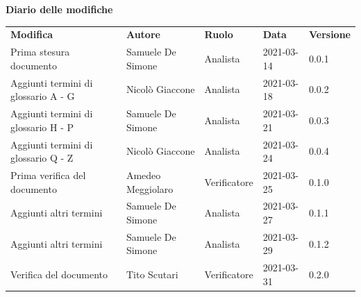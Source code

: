 \documentclass[a4paper]{article}
\begin{document}
\begin{center}
    \textbf{\Large Diario delle modifiche}\\
    \vspace{10px}
    \begin{table}[h!]
        \centering
        \renewcommand{\arraystretch}{1.8}
        \begin{tabular}{p{150px} p{90px} p{50px} p{60px} p{45px}}
            \rowcolor{logo!70} \textbf{Modifica} & \textbf{Autore}   & \textbf{Ruolo} & \textbf{Data} & \textbf{Versione} \\
            Prima stesura documento              & Samuele De Simone & Analista       & 2021-03-14    & 0.0.1             \\
            Aggiunti termini di glossario A - G  & Nicolò Giaccone   & Analista       & 2021-03-18    & 0.0.2             \\
            Aggiunti termini di glossario H - P  & Samuele De Simone & Analista       & 2021-03-21    & 0.0.3             \\
            Aggiunti termini di glossario Q - Z  & Nicolò Giaccone   & Analista       & 2021-03-24    & 0.0.4             \\
            Prima verifica del documento         & Amedeo Meggiolaro & Verificatore   & 2021-03-25    & 0.1.0             \\
            Aggiunti altri termini               & Samuele De Simone & Analista       & 2021-03-27    & 0.1.1             \\
            Aggiunti altri termini               & Samuele De Simone & Analista       & 2021-03-29    & 0.1.2             \\
            Verifica del documento               & Tito Scutari      & Verificatore   & 2021-03-31    & 0.2.0             \\
        \end{tabular}
    \end{table}
\end{center}

\newpage
\tableofcontents
\newpage
\appendix


























\end{document}
